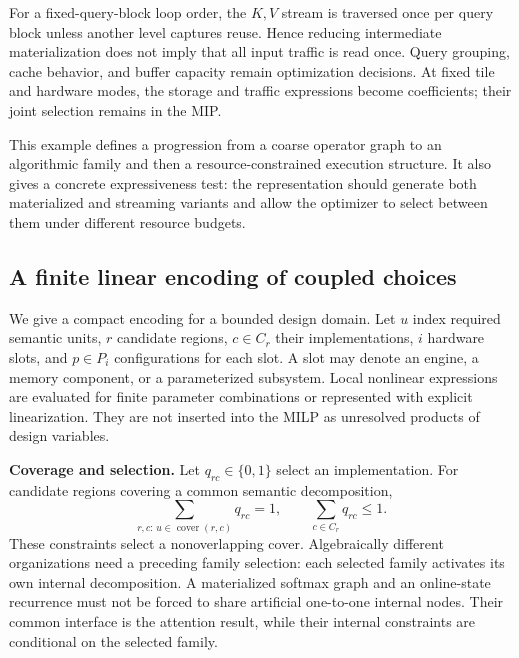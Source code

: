 For a fixed-query-block loop order, the $K,V$ stream is traversed once per query block unless another level captures reuse. Hence reducing intermediate materialization does not imply that all input traffic is read once. Query grouping, cache behavior, and buffer capacity remain optimization decisions. At fixed tile and hardware modes, the storage and traffic expressions become coefficients; their joint selection remains in the MIP.

This example defines a progression from a coarse operator graph to an algorithmic family and then a resource-constrained execution structure. It also gives a concrete expressiveness test: the representation should generate both materialized and streaming variants and allow the optimizer to select between them under different resource budgets.

\subsection{A finite linear encoding of coupled choices}\label{sec:encoding}
We give a compact encoding for a bounded design domain. Let $u$ index required semantic units, $r$ candidate regions, $c\in C_r$ their implementations, $i$ hardware slots, and $p\in P_i$ configurations for each slot. A slot may denote an engine, a memory component, or a parameterized subsystem. Local nonlinear expressions are evaluated for finite parameter combinations or represented with explicit linearization. They are not inserted into the MILP as unresolved products of design variables.

\textbf{Coverage and selection.}
Let $q_{rc}\in\{0,1\}$ select an implementation. For candidate regions covering a common semantic decomposition,
\begin{equation}
 \sum_{r,c:\,u\in\operatorname{cover}(r,c)}q_{rc}=1,
 \qquad \sum_{c\in C_r}q_{rc}\le1.\label{eq:cover}
\end{equation}
These constraints select a nonoverlapping cover. Algebraically different organizations need a preceding family selection: each selected family activates its own internal decomposition. A materialized softmax graph and an online-state recurrence must not be forced to share artificial one-to-one internal nodes. Their common interface is the attention result, while their internal constraints are conditional on the selected family.

